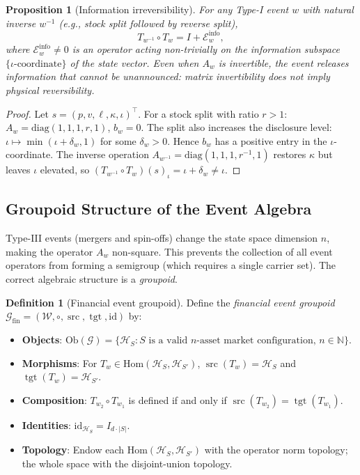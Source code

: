 \documentclass[12pt,a4paper]{article}
\theoremstyle{plain}
\newtheorem{proposition}[theorem]{Proposition}
\theoremstyle{definition}
\newtheorem{definition}[theorem]{Definition}
\newcommand{\N}{\mathbb{N}}
\newcommand{\Hil}{\mathcal{H}}
\newcommand{\diag}{\mathrm{diag}}
\newcommand{\1}{\mathbbm{1}}
\DeclareMathOperator{\src}{src}
\DeclareMathOperator{\tgt}{tgt}
\begin{document}
\begin{proposition}[Information irreversibility]
\label{prop:info_irrev}
For any Type-I event $w$ with natural inverse $w^{-1}$ (e.g., stock split
followed by reverse split),
\[
T_{w^{-1}} \circ T_w = I + \mathcal{E}^\mathrm{info}_{w},
\]
where $\mathcal{E}^\mathrm{info}_{w} \neq 0$ is an operator acting non-trivially
on the information subspace $\{\iota\text{-coordinate}\}$ of the state vector.
Even when $A_w$ is invertible, the event releases information that cannot be
unannounced: matrix invertibility does not imply physical reversibility.
\end{proposition}

\begin{proof}
Let $s = (p, v, \ell, \kappa, \iota)^\top$. For a stock split with ratio
$r > 1$: $A_w = \diag(1,1,1,r,1)$, $b_w = 0$. The split also increases the
disclosure level: $\iota \mapsto \min(\iota + \delta_w, 1)$ for some
$\delta_w > 0$. Hence $b_w$ has a positive entry in the $\iota$-coordinate.
The inverse operation $A_{w^{-1}} = \diag(1,1,1,r^{-1},1)$ restores
$\kappa$ but leaves $\iota$ elevated, so
$(T_{w^{-1}} \circ T_w)(s)_\iota = \iota + \delta_w \neq \iota$.
\end{proof}

\subsection{Groupoid Structure of the Event Algebra}

Type-III events (mergers and spin-offs) change the state space dimension $n$,
making the operator $A_w$ non-square. This prevents the collection of all
event operators from forming a semigroup (which requires a single carrier set).
The correct algebraic structure is a \emph{groupoid}.

\begin{definition}[Financial event groupoid]
\label{def:groupoid}
Define the \emph{financial event groupoid}
$\mathcal{G}_{\mathrm{fin}} = (\mathcal{W}, \circ, \src, \tgt, \mathrm{id})$ by:
\begin{itemize}
  \item \textbf{Objects}: $\mathrm{Ob}(\mathcal{G}) = \{\Hil_S : S \text{ is a
        valid $n$-asset market configuration, } n \in \N\}$.
  \item \textbf{Morphisms}: For $T_w \in \mathrm{Hom}(\Hil_S, \Hil_{S'})$,
        $\src(T_w) = \Hil_S$ and $\tgt(T_w) = \Hil_{S'}$.
  \item \textbf{Composition}: $T_{w_2} \circ T_{w_1}$ is defined if and only if
        $\src(T_{w_2}) = \tgt(T_{w_1})$.
  \item \textbf{Identities}: $\mathrm{id}_{\Hil_S} = I_{d\cdot|S|}$.
  \item \textbf{Topology}: Endow each $\mathrm{Hom}(\Hil_S, \Hil_{S'})$ with
        the operator norm topology; the whole space with the disjoint-union
        topology.
\end{itemize}
\end{definition}
\end{document}
